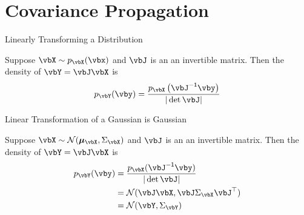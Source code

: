 \documentclass[8pt,aspectratio=169]{beamer}
\begin{document}
\section{Covariance Propagation}

\begin{frame}[fragile]{Linearly Transforming a Distribution}
  \begin{theorem}
    Suppose $\vbX \sim p_{\vbX}(\vbx)$ and $\vbJ$ is an an invertible matrix. Then the 
    density of $\vbY = \vbJ\vbX$ is 
    \[p_{\vbY}(\vby) = \frac{p_{\vbX} \left(\vbJ^{\inv} \vby\right)}{|\det \vbJ|} \]
  \end{theorem}
\end{frame}

\begin{frame}[fragile]{Linear Transformation of a Gaussian is Gaussian}
  \begin{theorem}
    Suppose $\vbX \sim \mathcal{N}(\vbmu_{\vbX},\Sigma_{\vbX})$ and
    $\vbJ$ is an an invertible matrix. Then the density of $\vbY =
    \vbJ\vbX$ is
    \begin{align*}
      p_{\vbY}(\vby) &= \frac{p_{\vbX}(\vbJ^{\inv}\vby)}{| \det \vbJ |}  \\
      &= \mathcal{N}(\vbJ\vbX,\vbJ\Sigma_{\vbX}\vbJ^{\T})  \\
      &= \mathcal{N}(\vbY,\Sigma_{\vbY})  \\
    \end{align*}
  \end{theorem}
\end{frame}
\end{document}
